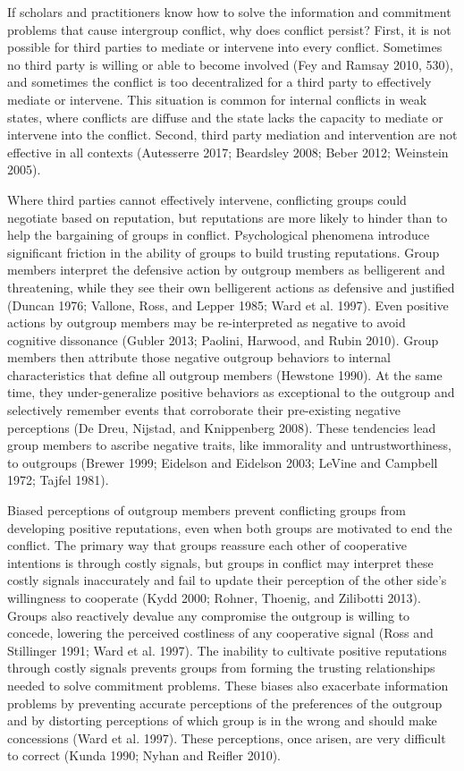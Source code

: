 \documentclass[11pt]{article}
\begin{document}
If scholars and practitioners know how to solve the information and
commitment problems that cause intergroup conflict, why does conflict
persist? First, it is not possible for third parties to mediate or
intervene into every conflict. Sometimes no third party is willing or
able to become involved (Fey and Ramsay 2010, 530), and sometimes the
conflict is too decentralized for a third party to effectively mediate
or intervene. This situation is common for internal conflicts in weak
states, where conflicts are diffuse and the state lacks the capacity to
mediate or intervene into the conflict. Second, third party mediation
and intervention are not effective in all contexts (Autesserre 2017;
Beardsley 2008; Beber 2012; Weinstein 2005).

Where third parties cannot effectively intervene, conflicting groups
could negotiate based on reputation, but reputations are more likely to
hinder than to help the bargaining of groups in conflict. Psychological
phenomena introduce significant friction in the ability of groups to
build trusting reputations. Group members interpret the defensive action
by outgroup members as belligerent and threatening, while they see their
own belligerent actions as defensive and justified (Duncan 1976;
Vallone, Ross, and Lepper 1985; Ward et al. 1997). Even positive actions
by outgroup members may be re-interpreted as negative to avoid cognitive
dissonance (Gubler 2013; Paolini, Harwood, and Rubin 2010). Group
members then attribute those negative outgroup behaviors to internal
characteristics that define all outgroup members (Hewstone 1990). At the
same time, they under-generalize positive behaviors as exceptional to
the outgroup and selectively remember events that corroborate their
pre-existing negative perceptions (De Dreu, Nijstad, and Knippenberg
2008). These tendencies lead group members to ascribe negative traits,
like immorality and untrustworthiness, to outgroups (Brewer 1999;
Eidelson and Eidelson 2003; LeVine and Campbell 1972; Tajfel 1981).

Biased perceptions of outgroup members prevent conflicting groups from
developing positive reputations, even when both groups are motivated to
end the conflict. The primary way that groups reassure each other of
cooperative intentions is through costly signals, but groups in conflict
may interpret these costly signals inaccurately and fail to update their
perception of the other side's willingness to cooperate (Kydd 2000;
Rohner, Thoenig, and Zilibotti 2013). Groups also reactively devalue any
compromise the outgroup is willing to concede, lowering the perceived
costliness of any cooperative signal (Ross and Stillinger 1991; Ward et
al. 1997). The inability to cultivate positive reputations through
costly signals prevents groups from forming the trusting relationships
needed to solve commitment problems. These biases also exacerbate
information problems by preventing accurate perceptions of the
preferences of the outgroup and by distorting perceptions of which group
is in the wrong and should make concessions (Ward et al. 1997). These
perceptions, once arisen, are very difficult to correct (Kunda 1990;
Nyhan and Reifler 2010).
\end{document}
